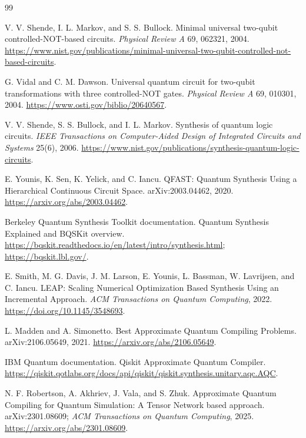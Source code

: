 \documentclass[11pt]{article}
\begin{document}
\begin{thebibliography}{99}

V. V. Shende, I. L. Markov, and S. S. Bullock.
\newblock Minimal universal two-qubit controlled-NOT-based circuits.
\newblock \emph{Physical Review A} 69, 062321, 2004.
\newblock \url{https://www.nist.gov/publications/minimal-universal-two-qubit-controlled-not-based-circuits}.

G. Vidal and C. M. Dawson.
\newblock Universal quantum circuit for two-qubit transformations with three
controlled-NOT gates.
\newblock \emph{Physical Review A} 69, 010301, 2004.
\newblock \url{https://www.osti.gov/biblio/20640567}.

V. V. Shende, S. S. Bullock, and I. L. Markov.
\newblock Synthesis of quantum logic circuits.
\newblock \emph{IEEE Transactions on Computer-Aided Design of Integrated
Circuits and Systems} 25(6), 2006.
\newblock \url{https://www.nist.gov/publications/synthesis-quantum-logic-circuits}.

E. Younis, K. Sen, K. Yelick, and C. Iancu.
\newblock QFAST: Quantum Synthesis Using a Hierarchical Continuous Circuit
Space.
\newblock arXiv:2003.04462, 2020.
\newblock \url{https://arxiv.org/abs/2003.04462}.

Berkeley Quantum Synthesis Toolkit documentation.
\newblock Quantum Synthesis Explained and BQSKit overview.
\newblock \url{https://bqskit.readthedocs.io/en/latest/intro/synthesis.html};
\url{https://bqskit.lbl.gov/}.

E. Smith, M. G. Davis, J. M. Larson, E. Younis, L. Bassman,
W. Lavrijsen, and C. Iancu.
\newblock LEAP: Scaling Numerical Optimization Based Synthesis Using an
Incremental Approach.
\newblock \emph{ACM Transactions on Quantum Computing}, 2022.
\newblock \url{https://doi.org/10.1145/3548693}.

L. Madden and A. Simonetto.
\newblock Best Approximate Quantum Compiling Problems.
\newblock arXiv:2106.05649, 2021.
\newblock \url{https://arxiv.org/abs/2106.05649}.

IBM Quantum documentation.
\newblock Qiskit Approximate Quantum Compiler.
\newblock \url{https://qiskit.qotlabs.org/docs/api/qiskit/qiskit.synthesis.unitary.aqc.AQC}.

N. F. Robertson, A. Akhriev, J. Vala, and S. Zhuk.
\newblock Approximate Quantum Compiling for Quantum Simulation: A Tensor Network
based approach.
\newblock arXiv:2301.08609; \emph{ACM Transactions on Quantum Computing}, 2025.
\newblock \url{https://arxiv.org/abs/2301.08609}.


\end{thebibliography}
\end{document}
